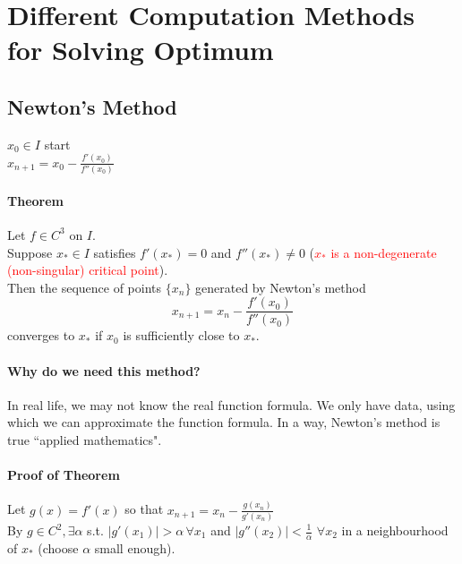 \documentclass[11pt]{article}
\begin{document}
\section{Different Computation Methods for Solving Optimum}
\subsection{Newton's Method}
$x_0 \in I$ start \\
$x_{n+1} = x_0 - \frac{f'(x_0)}{f''(x_0)}$

\paragraph{Theorem}
Let $f \in C^3$ on $I$.\\
Suppose $x_* \in I$ satisfies $f'(x_*) = 0$ and $f''(x_*) \neq 0$ (\textcolor{red}{$x_*$ is a non-degenerate (non-singular) critical point}).\\
Then the sequence of points $\{x_n\}$ generated by Newton's method 
$$x_{n+1} = x_n  - \frac{f'(x_0)}{f''(x_0)}$$ converges to $x_*$ if $x_0$ is sufficiently close to $x_*$.

\paragraph{Why do we need this method?}
In real life, we may not know the real function formula. We only have data, using which we can approximate the function formula. In a way, Newton's method is true ``applied mathematics".

\paragraph{Proof of Theorem}
Let $g(x) = f'(x)$ so that $x_{n+1} = x_n - \frac{g(x_n)}{g'(x_n)}$ \\
By $g \in C^2, \exists \alpha$ s.t. $|g'(x_1)| > \alpha \, \forall x_1$ and $|g''(x_2)| < \frac{1}{\alpha} \,\, \forall x_2$ in a neighbourhood of $x_*$ (choose $\alpha$ small enough).
\end{document}
